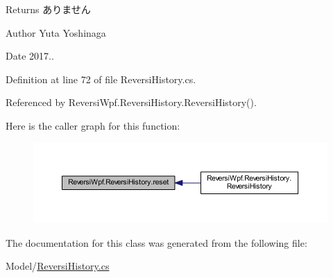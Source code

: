 \begin{DoxyReturn}{Returns}
ありません 
\end{DoxyReturn}
\begin{DoxyAuthor}{Author}
Yuta Yoshinaga 
\end{DoxyAuthor}
\begin{DoxyDate}{Date}
2017.. 
\end{DoxyDate}


Definition at line 72 of file Reversi\+History.\+cs.



Referenced by Reversi\+Wpf.\+Reversi\+History.\+Reversi\+History().

Here is the caller graph for this function\+:
\nopagebreak
\begin{figure}[H]
\begin{center}
\leavevmode
\includegraphics[width=350pt]{class_reversi_wpf_1_1_reversi_history_a2a57686bf23df7dcfa8ee9cd8cdc7fdb_icgraph}
\end{center}
\end{figure}


The documentation for this class was generated from the following file\+:\begin{DoxyCompactItemize}
\item 
Model/\hyperlink{_reversi_history_8cs}{Reversi\+History.\+cs}\end{DoxyCompactItemize}
